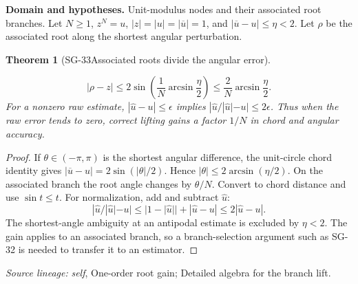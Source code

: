 \documentclass[11pt]{article}
\newtheorem{theorem}{Theorem}[section]
\theoremstyle{definition}\newtheorem{definition}[theorem]{Definition}
\theoremstyle{remark}\newtheorem{remark}[theorem]{Remark}
\begin{document}
\par{\small\textbf{Domain and hypotheses.} Unit-modulus nodes and their associated root branches. Let $N\ge1$, $z^N=u$, $|z|=|u|=|\overline u|=1$, and $|\overline u-u|\le\eta<2$. Let $\rho$ be the associated root along the shortest angular perturbation.}\par
\begin{theorem}[SG-33\quad Associated roots divide the angular error]\label{SG-33}

\[
 |\rho-z|\le2\sin\left(\frac1N\arcsin\frac\eta2\right)
 \le\frac2N\arcsin\frac\eta2.
\]
For a nonzero raw estimate, $|\widehat u-u|\le\epsilon$ implies
$|\widehat u/|\widehat u|-u|\le2\epsilon$. Thus when the raw error tends to
zero, correct lifting gains a factor $1/N$ in chord and angular accuracy.

\end{theorem}
\begin{proof}

If $\theta\in(-\pi,\pi)$ is the shortest angular difference, the unit-circle
chord identity gives $|\overline u-u|=2\sin(|\theta|/2)$.
Hence $|\theta|\le2\arcsin(\eta/2)$. On the associated branch the root
angle changes by $\theta/N$. Convert to chord distance and use $\sin t\le t$.
For normalization, add and subtract $\widehat u$:
\[
 |\widehat u/|\widehat u|-u|
 \le|1-|\widehat u||+|\widehat u-u|
 \le2|\widehat u-u|.
\]
The shortest-angle ambiguity at an antipodal estimate is excluded by
$\eta<2$. The gain applies to an associated branch, so a branch-selection
argument such as SG-32 is needed to transfer it to an estimator.

\end{proof}

\par{\small\color{Teal}\textit{Source lineage:} \textit{self}, One-order root gain; Detailed algebra for the branch lift.}\par
\end{document}
